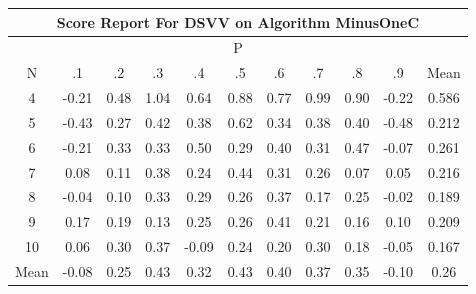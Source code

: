 \documentclass[11pt,a4paper]{report}
\begin{document}
\begin{longtable}{ | c || c | c | c | c | c | c | c | c | c || c |}
\hline
\multicolumn{11}{|c|}{ Score Report For DSVV on Algorithm MinusOneC} \\
\hline
\multicolumn{11}{|c|}{ P } \\
\hline
N & .1 & .2 & .3 & .4 & .5 & .6 & .7 & .8 & .9 & Mean\\
 \hline
 \hline
 \endhead
  4 &  \cellcolor[HTML]{FFF7F7} -0.21 &  \cellcolor[HTML]{EFEFFF} 0.48 &  \cellcolor[HTML]{E7E7FF} 1.04 &  \cellcolor[HTML]{EFEFFF} 0.64 &  \cellcolor[HTML]{E7E7FF} 0.88 &  \cellcolor[HTML]{EFEFFF} 0.77 &  \cellcolor[HTML]{E7E7FF} 0.99 &  \cellcolor[HTML]{E7E7FF} 0.90 &  \cellcolor[HTML]{FFF7F7} -0.22 & 0.586 \\
  5 &  \cellcolor[HTML]{FFF7F7} -0.43 &  \cellcolor[HTML]{F7F7FF} 0.27 &  \cellcolor[HTML]{F7F7FF} 0.42 &  \cellcolor[HTML]{F7F7FF} 0.38 &  \cellcolor[HTML]{EFEFFF} 0.62 &  \cellcolor[HTML]{F7F7FF} 0.34 &  \cellcolor[HTML]{F7F7FF} 0.38 &  \cellcolor[HTML]{F7F7FF} 0.40 &  \cellcolor[HTML]{FFEFEF} -0.48 & 0.212 \\
  6 &  \cellcolor[HTML]{FFF7F7} -0.21 &  \cellcolor[HTML]{F7F7FF} 0.33 &  \cellcolor[HTML]{F7F7FF} 0.33 &  \cellcolor[HTML]{EFEFFF} 0.50 &  \cellcolor[HTML]{F7F7FF} 0.29 &  \cellcolor[HTML]{F7F7FF} 0.40 &  \cellcolor[HTML]{F7F7FF} 0.31 &  \cellcolor[HTML]{F7F7FF} 0.47 &  \cellcolor[HTML]{FFFFFF} -0.07 & 0.261 \\
  7 &  \cellcolor[HTML]{FFFFFF} 0.08 &  \cellcolor[HTML]{FFFFFF} 0.11 &  \cellcolor[HTML]{F7F7FF} 0.38 &  \cellcolor[HTML]{F7F7FF} 0.24 &  \cellcolor[HTML]{F7F7FF} 0.44 &  \cellcolor[HTML]{F7F7FF} 0.31 &  \cellcolor[HTML]{F7F7FF} 0.26 &  \cellcolor[HTML]{FFFFFF} 0.07 &  \cellcolor[HTML]{FFFFFF} 0.05 & 0.216 \\
  8 &  \cellcolor[HTML]{FFFFFF} -0.04 &  \cellcolor[HTML]{FFFFFF} 0.10 &  \cellcolor[HTML]{F7F7FF} 0.33 &  \cellcolor[HTML]{F7F7FF} 0.29 &  \cellcolor[HTML]{F7F7FF} 0.26 &  \cellcolor[HTML]{F7F7FF} 0.37 &  \cellcolor[HTML]{F7F7FF} 0.17 &  \cellcolor[HTML]{F7F7FF} 0.25 &  \cellcolor[HTML]{FFFFFF} -0.02 & 0.189 \\
  9 &  \cellcolor[HTML]{F7F7FF} 0.17 &  \cellcolor[HTML]{F7F7FF} 0.19 &  \cellcolor[HTML]{FFFFFF} 0.13 &  \cellcolor[HTML]{F7F7FF} 0.25 &  \cellcolor[HTML]{F7F7FF} 0.26 &  \cellcolor[HTML]{F7F7FF} 0.41 &  \cellcolor[HTML]{F7F7FF} 0.21 &  \cellcolor[HTML]{F7F7FF} 0.16 &  \cellcolor[HTML]{FFFFFF} 0.10 & 0.209 \\
  10 &  \cellcolor[HTML]{FFFFFF} 0.06 &  \cellcolor[HTML]{F7F7FF} 0.30 &  \cellcolor[HTML]{F7F7FF} 0.37 &  \cellcolor[HTML]{FFFFFF} -0.09 &  \cellcolor[HTML]{F7F7FF} 0.24 &  \cellcolor[HTML]{F7F7FF} 0.20 &  \cellcolor[HTML]{F7F7FF} 0.30 &  \cellcolor[HTML]{F7F7FF} 0.18 &  \cellcolor[HTML]{FFFFFF} -0.05 & 0.167 \\
 \hline
 \hline
Mean &  \cellcolor[HTML]{FFFFFF} -0.08 &  \cellcolor[HTML]{F7F7FF} 0.25 &  \cellcolor[HTML]{F7F7FF} 0.43 &  \cellcolor[HTML]{F7F7FF} 0.32 &  \cellcolor[HTML]{F7F7FF} 0.43 &  \cellcolor[HTML]{F7F7FF} 0.40 &  \cellcolor[HTML]{F7F7FF} 0.37 &  \cellcolor[HTML]{F7F7FF} 0.35 &  \cellcolor[HTML]{FFFFFF} -0.10 &  \cellcolor[HTML]{F7F7FF} 0.26
\end{longtable}
\end{document}
